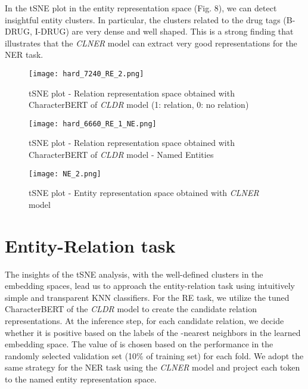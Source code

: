 \documentclass[11pt]{article}
\begin{document}
\par
In the tSNE plot in the entity representation space (Fig. 8), we can detect insightful entity clusters. In particular, the clusters related to the drug tags (B-DRUG, I-DRUG) are very dense and well shaped. This is a strong finding that illustrates that the \textit{CLNER} model can extract very good representations for the NER task.

\begin{figure}[!h]
  \centering
  \texttt{[image: hard\_7240\_RE\_2.png]}
  \vspace{-1.5ex} 
  \caption{tSNE plot - Relation representation space obtained with CharacterBERT of \textit{CLDR} model (1: relation, 0: no relation)}
  \vspace{-4mm}
\end{figure}


\begin{figure}[!h]
  \centering
  \texttt{[image: hard\_6660\_RE\_1\_NE.png]}
  \vspace{-1.5ex} 
  \caption{tSNE plot - Relation representation space obtained with CharacterBERT of \textit{CLDR} model - Named Entities}
  \vspace{-4mm}
\end{figure}


\begin{figure}[!h]
  \centering
  \texttt{[image: NE\_2.png]}
  \vspace{-1.5ex} 
  \caption{tSNE plot - Entity representation space obtained with \textit{CLNER} model}
  \vspace{-2mm}
\end{figure}

\vspace{-4mm}
\section{Entity-Relation task}

The insights of the tSNE analysis, with the well-defined clusters in the embedding spaces, lead us to approach the entity-relation task using intuitively simple and transparent KNN classifiers. For the RE task, we utilize the tuned CharacterBERT of the \textit{CLDR} model to create the candidate relation representations. At the inference step, for each candidate relation, we decide whether it is positive based on the labels of the -nearest neighbors in the learned embedding space. The value of  is chosen based on the performance in the randomly selected validation set (10\% of training set) for each fold. We adopt the same strategy for the NER task using the \textit{CLNER} model and project each token to the named entity representation space.
\end{document}
